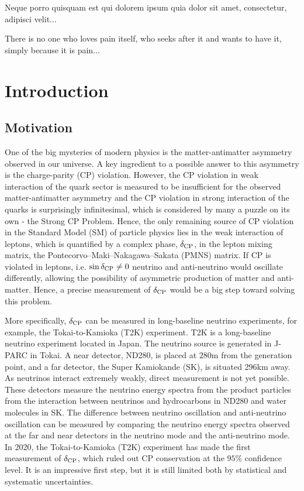 \begin{savequote}[8cm]
\textlatin{Neque porro quisquam est qui dolorem ipsum quia dolor sit amet, consectetur, adipisci velit...}

There is no one who loves pain itself, who seeks after it and wants to have it, simply because it is pain...
\end{savequote}

\chapter{\label{ch:1-intro}Introduction} 

\minitoc

\section{Motivation}
   One of the big mysteries of modern physics is the matter-antimatter asymmetry observed in our universe. A key ingredient to a possible answer to this asymmetry is the charge-parity (CP) violation. However, the CP violation in weak interaction of the quark sector is measured to be insufficient for the observed matter-antimatter asymmetry and the CP violation in strong interaction of the quarks is surprisingly infinitesimal, which is considered by many a puzzle on its own - the Strong CP Problem. Hence, the only remaining source of CP violation in the Standard Model (SM) of particle physics lies in the weak interaction of leptons, which is quantified by a complex phase, $\delta_\textrm{CP}$, in the lepton mixing matrix, the Pontecorvo–Maki–Nakagawa–Sakata (PMNS) matrix. If CP is violated in leptons, i.e. $\sin{\delta_\textrm{CP}}\neq0$ neutrino and anti-neutrino would oscillate differently, allowing the possibility of asymmetric production of matter and anti-matter. Hence, a precise measurement of $\delta_\textrm{CP}$ would be a big step toward solving this problem. 
   
   More specifically, $\delta_\textrm{CP}$ can be measured in long-baseline neutrino experiments, for example, the Tokai-to-Kamioka (T2K) experiment\cite{T2KEXP}. T2K is a long-baseline neutrino experiment located in Japan. The neutrino source is generated in J-PARC in Tokai. A near detector, ND280, is placed at $280\textrm{m}$ from the generation point, and a far detector, the Super Kamiokande (SK), is situated 296km away. As neutrinos interact extremely weakly, direct measurement is not yet possible. These detectors measure the neutrino energy spectra from the product particles from the interaction between neutrinos and hydrocarbons in ND280 and water molecules in SK. The difference between neutrino oscillation and anti-neutrino oscillation can be measured by comparing the neutrino energy spectra observed at the far and near detectors in the neutrino mode and the anti-neutrino mode. In 2020, the Tokai-to-Kamioka (T2K) experiment\cite{T2KEXP} has made the first measurement of $\delta_\textrm{CP}$\cite{T2Knature}, which ruled out CP conservation at the $95\%$ confidence level. It is an impressive first step, but it is still limited both by statistical and systematic uncertainties. 

